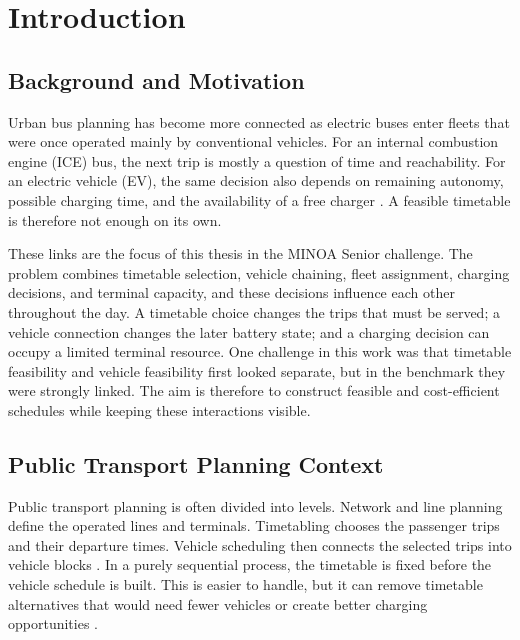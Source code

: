 \chapter{Introduction}
\label{chap:introduction}

\section{Background and Motivation}

Urban bus planning has become more connected as electric buses enter fleets
that were once operated mainly by conventional vehicles.  For an internal
combustion engine (ICE) bus, the next trip is mostly a question of time and
reachability.  For an electric vehicle (EV), the same decision also depends on
remaining autonomy, possible charging time, and the availability of a free
charger \cite{li2014,kooten2017,rogge2018}.  A feasible timetable is therefore
not enough on its own.

These links are the focus of this thesis in the MINOA Senior challenge.  The
problem combines timetable selection, vehicle chaining, fleet assignment,
charging decisions, and terminal capacity, and these decisions influence each
other throughout the day.  A timetable choice changes the trips that must be
served; a vehicle connection changes the later battery state; and a charging
decision can occupy a limited terminal resource.  One challenge in this work
was that timetable feasibility and vehicle feasibility first looked separate,
but in the benchmark they were strongly linked.  The aim is therefore to
construct feasible and cost-efficient schedules while keeping these interactions
visible.

\section{Public Transport Planning Context}

Public transport planning is often divided into levels. Network and line
planning define the operated lines and terminals. Timetabling chooses the
passenger trips and their departure times. Vehicle scheduling then connects the
selected trips into vehicle blocks \cite{ceder2016,desaulniers2007,bunte2009}.
In a purely sequential process, the
timetable is fixed before the vehicle schedule is built. This is easier to
handle, but it can remove timetable alternatives that would need fewer vehicles
or create better charging opportunities \cite{michaelis2009,schmid2015}.

